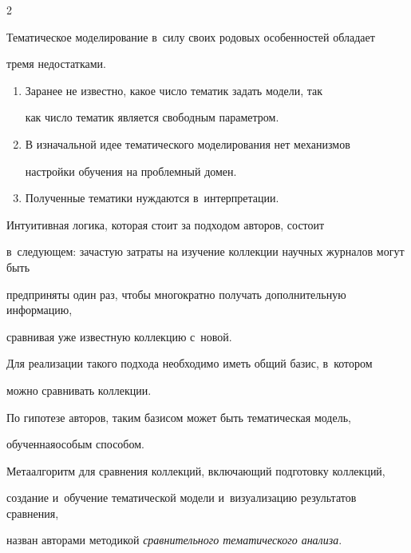 \begin{multicols}{2}
    


    Тематическое моделирование в~силу своих родовых особенностей обладает 


тремя недостатками.


        \begin{enumerate}[1.]


               \item Заранее не известно, какое число тематик задать модели, так 


как число тематик является свободным параметром.


        \item В изначальной идее тематического моделирования нет механизмов 


настройки обучения на проблемный домен.


        \item Полученные тематики нуждаются в~интерпретации.


    \end{enumerate}


    


    Интуитивная логика, которая стоит за подходом авторов, состоит 


    в~следующем: зачастую затраты на изучение коллекции научных журналов могут быть 


предприняты один раз, чтобы многократно получать дополнительную информацию, 


сравнивая уже известную коллекцию с~новой.


    


    Для реализации такого подхода необходимо иметь общий базис, в~котором 


можно сравнивать коллекции.


    По гипотезе авторов, таким базисом может быть тематическая модель, 


обученная\linebreak особым способом.


    Метаалгоритм для сравнения коллекций, включающий подготовку коллекций, 


создание и~обучение тематической модели и~\mbox{визуализацию} результатов сравнения, 


назван авторами методикой \textit{сравнительного тематического анализа}. 









\end{multicols}
